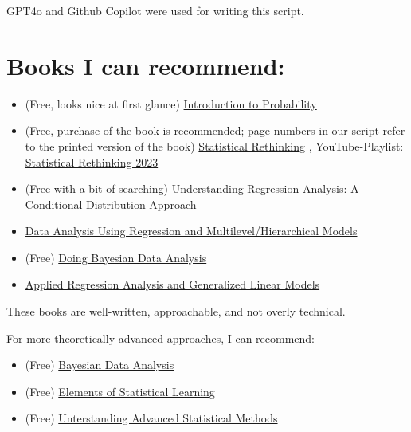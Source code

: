 \documentclass[
]{book}
\providecommand{\tightlist}{%
  \setlength{\itemsep}{0pt}\setlength{\parskip}{0pt}}
\begin{document}
GPT4o and Github Copilot were used for writing this script.

\section{Books I can recommend:}\label{books-i-can-recommend}

\begin{itemize}
\tightlist
\item
  (Free, looks nice at first glance) \href{https://ia803404.us.archive.org/6/items/introduction-to-probability-joseph-k.-blitzstein-jessica-hwang/Introduction\%20to\%20Probability-Joseph\%20K.\%20Blitzstein\%2C\%20Jessica\%20Hwang.pdf}{Introduction to Probability}
\item
  (Free, purchase of the book is recommended; page numbers in our script refer to the printed version of the book) \href{https://github.com/Booleans/statistical-rethinking/blob/master/Statistical\%20Rethinking\%202nd\%20Edition.pdf}{Statistical Rethinking}
  , YouTube-Playlist: \href{https://youtu.be/FdnMWdICdRs?si=q2py5QVY_L299hEa}{Statistical Rethinking 2023}
\item
  (Free with a bit of searching) \href{https://vdoc.pub/documents/understanding-regression-analysis-a-conditional-distribution-approach-84oqjr8sqva0}{Understanding Regression Analysis: A Conditional Distribution Approach}
\item
  \href{http://www.stat.columbia.edu/~gelman/arm/}{Data Analysis Using Regression and Multilevel/Hierarchical Models}
\item
  (Free) \href{https://nyu-cdsc.github.io/learningr/assets/kruschke_bayesian_in_R.pdf}{Doing Bayesian Data Analysis}
\item
  \href{https://us.sagepub.com/en-us/nam/applied-regression-analysis-and-generalized-linear-models/book237254}{Applied Regression Analysis and Generalized Linear Models}
\end{itemize}

These books are well-written, approachable, and not overly technical.

For more theoretically advanced approaches, I can recommend:

\begin{itemize}
\tightlist
\item
  (Free) \href{http://www.stat.columbia.edu/~gelman/book/}{Bayesian Data Analysis}
\item
  (Free) \href{https://web.stanford.edu/~hastie/ElemStatLearn/}{Elements of Statistical Learning}
\item
  (Free) \href{https://students.aiu.edu/submissions/profiles/resources/onlineBook/y6z7i8_t4q6Z9_advanced\%20statistics.pdf}{Unterstanding Advanced Statistical Methods}
\end{itemize}
\end{document}
